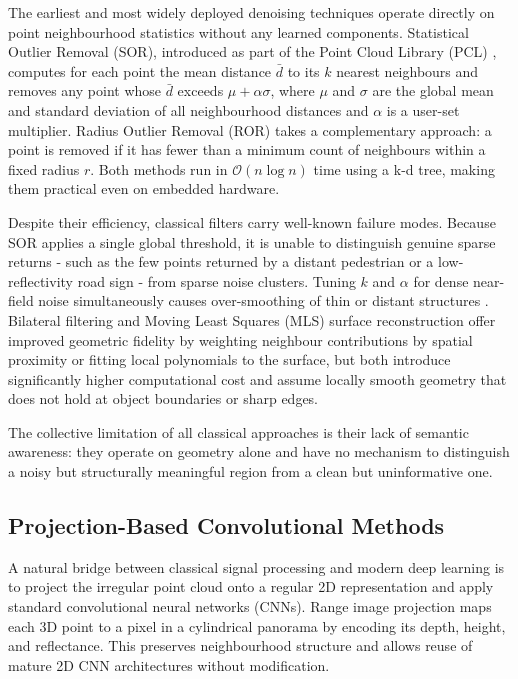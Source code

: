 \documentclass[12pt,a4paper]{article}
\begin{document}
The earliest and most widely deployed denoising techniques operate directly
on point neighbourhood statistics without any learned components. Statistical
Outlier Removal (SOR), introduced as part of the Point Cloud Library (PCL)
\cite{rusu2011pcl}, computes for each point the mean distance $\bar{d}$ to
its $k$ nearest neighbours and removes any point whose $\bar{d}$ exceeds
$\mu + \alpha\sigma$, where $\mu$ and $\sigma$ are the global mean and
standard deviation of all neighbourhood distances and $\alpha$ is a user-set
multiplier. Radius Outlier Removal (ROR) takes a complementary approach: a
point is removed if it has fewer than a minimum count of neighbours within a
fixed radius $r$. Both methods run in $\mathcal{O}(n \log n)$ time using a
k-d tree, making them practical even on embedded hardware.

Despite their efficiency, classical filters carry well-known failure modes.
Because SOR applies a single global threshold, it is unable to distinguish
genuine sparse returns - such as the few points returned by a distant
pedestrian or a low-reflectivity road sign - from sparse noise clusters.
Tuning $k$ and $\alpha$ for dense near-field noise simultaneously causes
over-smoothing of thin or distant structures \cite{heinzler2020cnn}.
Bilateral filtering and Moving Least Squares (MLS) surface reconstruction
offer improved geometric fidelity by weighting neighbour contributions by
spatial proximity or fitting local polynomials to the surface, but both
introduce significantly higher computational cost and assume locally smooth
geometry that does not hold at object boundaries or sharp edges.

The collective limitation of all classical approaches is their lack of
semantic awareness: they operate on geometry alone and have no mechanism to
distinguish a noisy but structurally meaningful region from a clean but
uninformative one.

\subsection{Projection-Based Convolutional Methods}

A natural bridge between classical signal processing and modern deep learning
is to project the irregular point cloud onto a regular 2D representation and
apply standard convolutional neural networks (CNNs). Range image projection
maps each 3D point to a pixel in a cylindrical panorama by encoding its
depth, height, and reflectance. This preserves neighbourhood structure and
allows reuse of mature 2D CNN architectures without modification.
\end{document}
